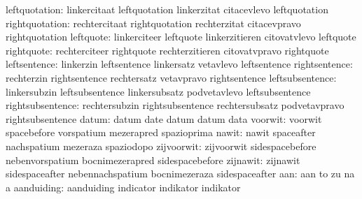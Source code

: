             leftquotation: linkercitaat              leftquotation
                           linkerzitat               citacevlevo
                           leftquotation             %
           rightquotation: rechtercitaat             rightquotation
                           rechterzitat              citacevpravo
                           rightquotation            %
                leftquote: linkerciteer              leftquote
                           linkerzitieren            citovatvlevo
                           leftquote                 %
               rightquote: rechterciteer             rightquote
                           rechterzitieren           citovatvpravo
                           rightquote                %
             leftsentence: linkerzin                 leftsentence
                           linkersatz                vetavlevo
                           leftsentence              %
            rightsentence: rechterzin                rightsentence
                           rechtersatz               vetavpravo
                           rightsentence             %
          leftsubsentence: linkersubzin              leftsubsentence
                           linkersubsatz             podvetavlevo
                           leftsubsentence           %
         rightsubsentence: rechtersubzin             rightsubsentence
                           rechtersubsatz            podvetavpravo
                           rightsubsentence          %
                    datum: datum                     date
                           datum                     datum
                           data
                  voorwit: voorwit                   spacebefore
                           vorspatium                mezerapred
                           spazioprima
                    nawit: nawit                     spaceafter
                           nachspatium               mezeraza
                           spaziodopo
               zijvoorwit: zijvoorwit                sidespacebefore
                           nebenvorspatium           bocnimezerapred
                           sidespacebefore           %
                 zijnawit: zijnawit                  sidespaceafter
                           nebennachspatium          bocnimezeraza
                           sidespaceafter            %
                      aan: aan                       to
                           zu                        na
                           a
               aanduiding: aanduiding                indicator
                           indikator                 indikator
